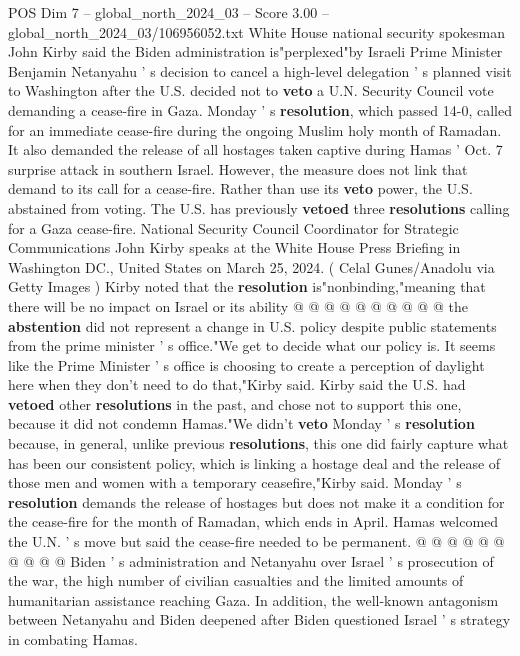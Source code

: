 \begin{textsample}{POS Dim 7 – global\_north\_2024\_03 – Score 3.00 – global\_north\_2024\_03/106956052.txt}  \label{ex:f7_pos_218}
White House national security spokesman John Kirby said the Biden administration is"perplexed"by Israeli Prime Minister Benjamin Netanyahu ' s decision to cancel a high-level delegation ' s planned visit to Washington after the U.S. decided not to \textbf{veto} a U.N.
Security Council vote demanding a cease-fire in Gaza.
Monday ' s \textbf{resolution}, which passed 14-0, called for an immediate cease-fire during the ongoing Muslim holy month of Ramadan.
It also demanded the release of all hostages taken captive during Hamas ' Oct. 7 surprise attack in southern Israel.
However, the measure does not link that demand to its call for a cease-fire.
Rather than use its \textbf{veto} power, the U.S. abstained from voting.
The U.S. has previously \textbf{vetoed} three \textbf{resolutions} calling for a Gaza cease-fire.
National Security Council Coordinator for Strategic Communications John Kirby speaks at the White House Press Briefing in Washington DC., United States on March 25, 2024. ( Celal Gunes/Anadolu via Getty Images ) Kirby noted that the \textbf{resolution} is"nonbinding,"meaning that there will be no impact on Israel or its ability @ @ @ @ @ @ @ @ @ @ the \textbf{abstention} did not represent a change in U.S. policy despite public statements from the prime minister ' s office."We get to decide what our policy is.
It seems like the Prime Minister ' s office is choosing to create a perception of daylight here when they don't need to do that,"Kirby said.
Kirby said the U.S. had \textbf{vetoed} other \textbf{resolutions} in the past, and chose not to support this one, because it did not condemn Hamas."We didn't \textbf{veto} Monday ' s \textbf{resolution} because, in general, unlike previous \textbf{resolutions}, this one did fairly capture what has been our consistent policy, which is linking a hostage deal and the release of those men and women with a temporary ceasefire,"Kirby said.
Monday ' s \textbf{resolution} demands the release of hostages but does not make it a condition for the cease-fire for the month of Ramadan, which ends in April.
Hamas welcomed the U.N. ' s move but said the cease-fire needed to be permanent. @ @ @ @ @ @ @ @ @ @ Biden ' s administration and Netanyahu over Israel ' s prosecution of the war, the high number of civilian casualties and the limited amounts of humanitarian assistance reaching Gaza.
In addition, the well-known antagonism between Netanyahu and Biden deepened after Biden questioned Israel ' s strategy in combating Hamas.

\end{textsample}
